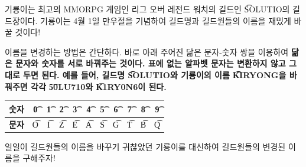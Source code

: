 기룡이는 최고의 MMORPG 게임인 리그 오버 레전드 워치의 길드인 \t{SOLUTIO}의 길드장이다. 
기룡이는 4월 1일 만우절을 기념하여 길드명과 길드원들의 이름을 재밌게 바꿀 것이다!

이름을 변경하는 방법은 간단하다. 
바로 아래 주어진 닮은 문자-숫자 쌍을 이용하여 \bf{닮은 문자와 숫자를 서로 바꿔주는 것}이다. 
표에 없는 알파벳 문자는 변환하지 않고 그대로 두면 된다. 
예를 들어,  길드명 \t{SOLUTIO}와 기룡이의 이름 \t{KIRYONG}을 바꿔주면 각각 \t{50LU710}와 \t{K1RY0N6}이 된다.

\begin{center}
  \begin{tabular}{ | c | c | c | c | c | c | c | c | c | c | c | } \hline
    \bf{숫자} & \t{0} & \t{1} & \t{2} & \t{3} & \t{4} & \t{5} & \t{6} & \t{7} & \t{8} & \t{9} \\ \hline
    \bf{문자} & \t{O} & \t{I} & \t{Z} & \t{E} & \t{A} & \t{S} & \t{G} & \t{T} & \t{B} & \t{Q} \\ \hline
  \end{tabular}
\end{center}



일일이 길드원들의 이름을 바꾸기 귀찮았던 기룡이를 대신하여 길드원들의 변경된 이름을 구해주자!